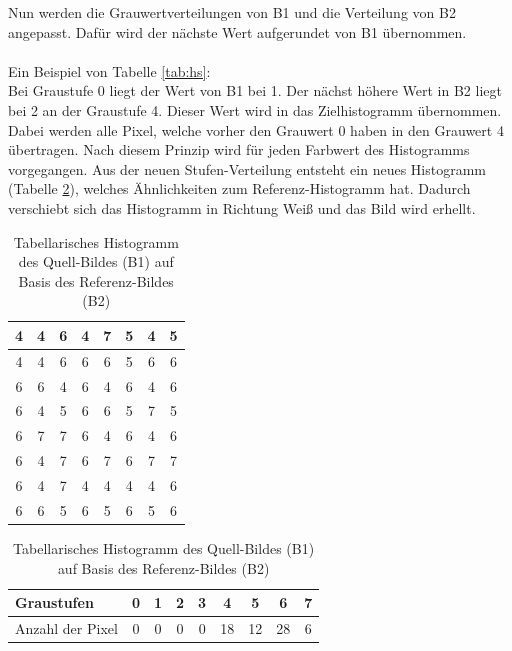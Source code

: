 Nun werden die Grauwertverteilungen von B1 und die Verteilung von B2 angepasst. Dafür wird der nächste Wert aufgerundet von B1 übernommen.\\\\
Ein Beispiel von Tabelle \ref{tab:hs}: \\
Bei Graustufe 0 liegt der Wert von B1 bei 1. Der nächst höhere Wert in B2 liegt bei 2 an der Graustufe 4. Dieser Wert wird in das Zielhistogramm übernommen. Dabei werden alle Pixel, welche vorher den Grauwert 0 haben in den Grauwert 4 übertragen. Nach diesem Prinzip wird für jeden Farbwert des Histogramms vorgegangen. Aus der neuen Stufen-Verteilung entsteht ein neues Histogramm (Tabelle \ref{tab:B3}), welches Ähnlichkeiten zum Referenz-Histogramm hat. Dadurch verschiebt sich das Histogramm in Richtung Weiß und das Bild wird erhellt.
  \begin{table}[t]
  \caption{Tabellarisches Histogramm des Quell-Bildes (B1) auf Basis des Referenz-Bildes (B2)}
  \label{tab:B3}
  \centering
  \begin{minipage}{\textwidth}
  \center
  \begin{tabular}{|c|c|c|c|c|c|c|c|}
  \hline
  4&4&6&4&7&5&4&5\\
  \hline
  4&4&6&6&6&5&6&6\\
  \hline
  6&6&4&6&4&6&4&6\\
  \hline
  6&4&5&6&6&5&7&5\\
  \hline
  6&7&7&6&4&6&4&6\\
  \hline
  6&4&7&6&7&6&7&7\\
  \hline
  6&4&7&4&4&4&4&6\\
  \hline
  6&6&5&6&5&6&5&6\\
  \hline
  \end{tabular}
  \end{minipage}
  \begin{minipage}{\textwidth}
  \hspace{\textwidth}
  \end{minipage}
  \begin{minipage}{\textwidth}
  \center
  \begin{tabular}{|l|c|c|c|c|c|c|c|c|}
  \hline
  Graustufen & 0 & 1 & 2 & 3 & 4 & 5 & 6 & 7\\
  \hline
  Anzahl der Pixel & 0 & 0 & 0 & 0 & 18 & 12 & 28 & 6\\
  \hline
  \end{tabular}
  \end{minipage}
  \end{table}